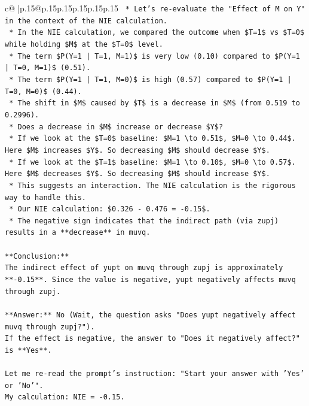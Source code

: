 \documentclass{article}
\begin{document}
{\begin{supertabular}{c@{$\;$}|p{.15\linewidth}@{}p{.15\linewidth}p{.15\linewidth}p{.15\linewidth}p{.15\linewidth}p{.15\linewidth}}
{{{\texttt{    *   Let's re{-}evaluate the "Effect of M on Y" in the context of the NIE calculation.} \\
\texttt{    *   In the NIE calculation, we compared the outcome when \$T=1\$ vs \$T=0\$ while holding \$M\$ at the \$T=0\$ level.} \\
\texttt{    *   The term \$P(Y=1 | T=1, M=1)\$ is very low (0.10) compared to \$P(Y=1 | T=0, M=1)\$ (0.51).} \\
\texttt{    *   The term \$P(Y=1 | T=1, M=0)\$ is high (0.57) compared to \$P(Y=1 | T=0, M=0)\$ (0.44).} \\
\texttt{    *   The shift in \$M\$ caused by \$T\$ is a decrease in \$M\$ (from 0.519 to 0.2996).} \\
\texttt{    *   Does a decrease in \$M\$ increase or decrease \$Y\$?} \\
\texttt{        *   If we look at the \$T=0\$ baseline: \$M=1 \textbackslash{}to 0.51\$, \$M=0 \textbackslash{}to 0.44\$. Here \$M\$ increases \$Y\$. So decreasing \$M\$ should decrease \$Y\$.} \\
\texttt{        *   If we look at the \$T=1\$ baseline: \$M=1 \textbackslash{}to 0.10\$, \$M=0 \textbackslash{}to 0.57\$. Here \$M\$ decreases \$Y\$. So decreasing \$M\$ should increase \$Y\$.} \\
\texttt{    *   This suggests an interaction. The NIE calculation is the rigorous way to handle this.} \\
\texttt{    *   Our NIE calculation: \$0.326 {-} 0.476 = {-}0.15\$.} \\
\texttt{    *   The negative sign indicates that the indirect path (via zupj) results in a **decrease** in muvq.} \\
\\ 
\texttt{**Conclusion:**} \\
\texttt{The indirect effect of yupt on muvq through zupj is approximately **{-}0.15**. Since the value is negative, yupt negatively affects muvq through zupj.} \\
\\ 
\texttt{**Answer:** No (Wait, the question asks "Does yupt negatively affect muvq through zupj?").} \\
\texttt{If the effect is negative, the answer to "Does it negatively affect?" is **Yes**.} \\
\\ 
\texttt{Let me re{-}read the prompt's instruction: "Start your answer with 'Yes' or 'No'".} \\
\texttt{My calculation: NIE = {-}0.15.} \\
}}}
\end{supertabular}}
\end{document}
